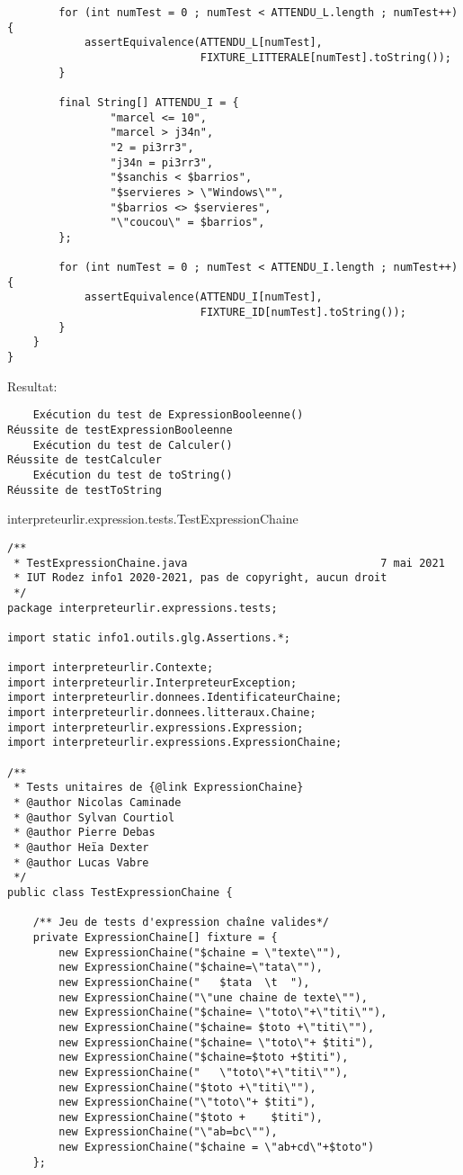 \begin{enum}
\begin{verbatim}
        for (int numTest = 0 ; numTest < ATTENDU_L.length ; numTest++) {
            assertEquivalence(ATTENDU_L[numTest], 
                              FIXTURE_LITTERALE[numTest].toString());
        }
        
        final String[] ATTENDU_I = {
                "marcel <= 10",
                "marcel > j34n",
                "2 = pi3rr3",
                "j34n = pi3rr3",
                "$sanchis < $barrios",
                "$servieres > \"Windows\"",
                "$barrios <> $servieres",
                "\"coucou\" = $barrios",
        };
        
        for (int numTest = 0 ; numTest < ATTENDU_I.length ; numTest++) {
            assertEquivalence(ATTENDU_I[numTest], 
                              FIXTURE_ID[numTest].toString());
        }
    }
}
\end{verbatim}
Resultat:
\begin{verbatim}
    Exécution du test de ExpressionBooleenne()
Réussite de testExpressionBooleenne
    Exécution du test de Calculer()
Réussite de testCalculer
    Exécution du test de toString()
Réussite de testToString
\end{verbatim}

    \item interpreteurlir.expression.tests.TestExpressionChaine
\begin{verbatim}
/**
 * TestExpressionChaine.java                              7 mai 2021
 * IUT Rodez info1 2020-2021, pas de copyright, aucun droit
 */
package interpreteurlir.expressions.tests;

import static info1.outils.glg.Assertions.*;

import interpreteurlir.Contexte;
import interpreteurlir.InterpreteurException;
import interpreteurlir.donnees.IdentificateurChaine;
import interpreteurlir.donnees.litteraux.Chaine;
import interpreteurlir.expressions.Expression;
import interpreteurlir.expressions.ExpressionChaine;

/**
 * Tests unitaires de {@link ExpressionChaine}
 * @author Nicolas Caminade
 * @author Sylvan Courtiol
 * @author Pierre Debas
 * @author Heïa Dexter
 * @author Lucas Vabre
 */
public class TestExpressionChaine {
    
    /** Jeu de tests d'expression chaîne valides*/
    private ExpressionChaine[] fixture = {
        new ExpressionChaine("$chaine = \"texte\""),  
        new ExpressionChaine("$chaine=\"tata\""),
        new ExpressionChaine("   $tata  \t  "),
        new ExpressionChaine("\"une chaine de texte\""),
        new ExpressionChaine("$chaine= \"toto\"+\"titi\""),
        new ExpressionChaine("$chaine= $toto +\"titi\""),
        new ExpressionChaine("$chaine= \"toto\"+ $titi"),
        new ExpressionChaine("$chaine=$toto +$titi"),
        new ExpressionChaine("   \"toto\"+\"titi\""),
        new ExpressionChaine("$toto +\"titi\""),
        new ExpressionChaine("\"toto\"+ $titi"),
        new ExpressionChaine("$toto +    $titi"),
        new ExpressionChaine("\"ab=bc\""),
        new ExpressionChaine("$chaine = \"ab+cd\"+$toto")
    };


\end{verbatim}
\end{enum}
